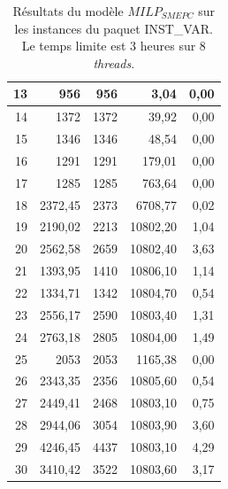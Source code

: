 {\begin{table}[H]
{\begin{tabular}{|r|r|r|r|r|}
		13	&	956	&	956	&	3,04	&	0,00	\\ \hline
		14	&	1372	&	1372	&	39,92	&	0,00	\\ \hline
		15	&	1346	&	1346	&	48,54	&	0,00	\\ \hline
		16	&	1291	&	1291	&	179,01	&	0,00	\\ \hline
		17	&	1285	&	1285	&	763,64	&	0,00	\\ \hline
		18	&	2372,45	&	2373	&	6708,77	&	0,02	\\ \hline
		19	&	2190,02	&	2213	&	10802,20	&	1,04	\\ \hline
		20	&	2562,58	&	2659	&	10802,40	&	3,63	\\ \hline
		21	&	1393,95	&	1410	&	10806,10	&	1,14	\\ \hline
		22	&	1334,71	&	1342	&	10804,70	&	0,54	\\ \hline
		23	&	2556,17	&	2590	&	10803,40	&	1,31	\\ \hline
		24	&	2763,18	&	2805	&	10804,00	&	1,49	\\ \hline
		25	&	2053	&	2053	&	1165,38	&	0,00	\\ \hline
		26	&	2343,35	&	2356	&	10805,60	&	0,54	\\ \hline
		27	&	2449,41	&	2468	&	10803,10	&	0,75	\\ \hline
		28	&	2944,06	&	3054	&	10803,90	&	3,60	\\ \hline
		29	&	4246,45	&	4437	&	10803,10	&	4,29	\\ \hline
		30	&	3410,42	&	3522	&	10803,60	&	3,17	\\ \hline
			
	\bottomrule
\end{tabular}%
}\caption[Résultats de $MILP_{SMEPC}$ sur INST\_VAR. Le temps limite est 3 heures sur 8 \textit{threads}]{Résultats du modèle $MILP_{SMEPC}$ sur les instances du paquet INST\_VAR. Le temps limite est 3 heures sur 8 \textit{threads}.}
\label{tab:resultSYM_STC}%
\end{table}%
}

